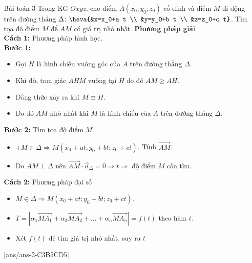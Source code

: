 \begin{dang}{Bài toán 3}
Trong KG $Oxyz$, cho điểm $A\left(x_0 ; y_0 ; z_0\right)$ cố định và điểm $M$ di động trên đường thẳng $\Delta\colon\heva{&x=x_0+a t \\ &y=y_0+b t \\ &z=z_0+c t}$. Tìm tọa độ điểm $M$ để $AM$ có giá trị nhỏ nhất.
\textbf{Phương pháp giải}
\\
\textbf{Cách 1:} Phương pháp hình học.
\\
\textbf{Bước 1:}
\begin{itemize}
	\item Gọi $H$ là hình chiếu vuông góc của $A$ trên đường thẳng $\Delta$.
	\item Khi đó, tam giác $AH M$ vuông tại $H$ do đó $AM \geq AH$.
	\item Đẳng thức xảy ra khi $M \equiv H$.
	\item Do đó $AM$ nhỏ nhất khi $M$ là hình chiếu của $A$ trên đường thẳng $\Delta$.
\end{itemize}
\textbf{Bước 2:} Tìm tọa độ điểm $M$.
\begin{itemize}
	\item $+M \in \Delta \Rightarrow M\left(x_0+a t ; y_0+b t ; z_0+c t\right)$. Tính $\vec{AM}$.
	\item Do $AM \perp \Delta$ nên $\vec{AM} \cdot \vec{u}_{\Delta}=0 \Rightarrow t \Rightarrow$ độ điểm $M$ cần tìm.
\end{itemize}

\textbf{Cách 2:} Phương pháp đại số
\begin{itemize}
	\item $M \in \Delta \Rightarrow M\left(x_0+a t ; y_0+b t ; z_0+c t\right)$.
	\item $T=\left|\alpha_1 \vec{MA_1}+\alpha_2 \vec{MA_2}+\ldots+\alpha_n \vec{MA_n}\right|=f(t)$ theo hàm $t$.
	\item Xét $f(t)$ để tìm giá trị nhỏ nhất, suy ra $t$
\end{itemize}
\end{dang}
[ans/ans-2-C3B5CD5]
\TN
